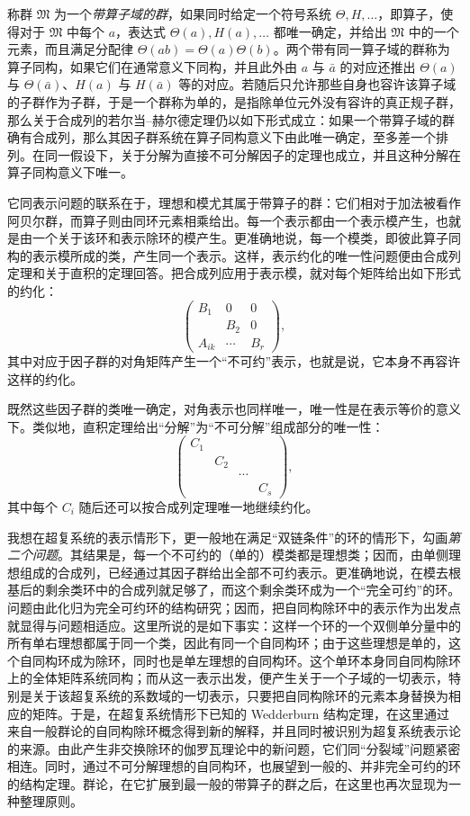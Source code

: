 称群 $\mathfrak{M}$ 为一个\emph{带算子域的群}，如果同时给定一个符号系统 $\Theta,H,\ldots$，即算子，使得对于 $\mathfrak{M}$ 中每个 $a$，表达式 $\Theta(a),H(a),\ldots$ 都唯一确定，并给出 $\mathfrak{M}$ 中的一个元素，而且满足分配律 $\Theta(ab)=\Theta(a)\Theta(b)$。两个带有同一算子域的群称为算子同构，如果它们在通常意义下同构，并且此外由 $a$ 与 $\bar a$ 的对应还推出 $\Theta(a)$ 与 $\Theta(\bar a)$、$H(a)$ 与 $H(\bar a)$ 等的对应。若随后只允许那些自身也容许该算子域的子群作为子群，于是一个群称为单的，是指除单位元外没有容许的真正规子群，那么关于合成列的若尔当--赫尔德定理仍以如下形式成立：如果一个带算子域的群确有合成列，那么其因子群系统在算子同构意义下由此唯一确定，至多差一个排列。在同一假设下，关于分解为直接不可分解因子的定理也成立，并且这种分解在算子同构意义下唯一。

它同表示问题的联系在于，理想和模尤其属于带算子的群：它们相对于加法被看作阿贝尔群，而算子则由同环元素相乘给出。每一个表示都由一个表示模产生，也就是由一个关于该环和表示除环的模产生。更准确地说，每一个模类，即彼此算子同构的表示模所成的类，产生同一个表示。这样，表示约化的唯一性问题便由合成列定理和关于直积的定理回答。把合成列应用于表示模，就对每个矩阵给出如下形式的约化：
\[
\begin{pmatrix}
B_1&0&0\\
&B_2&0\\
A_{ik}&\cdots&B_r
\end{pmatrix},
\]
其中对应于因子群的对角矩阵产生一个“不可约”表示，也就是说，它本身不再容许这样的约化。

既然这些因子群的类唯一确定，对角表示也同样唯一，唯一性是在表示等价的意义下。类似地，直积定理给出“分解”为“不可分解”组成部分的唯一性：
\[
\begin{pmatrix}
C_1&&&\\
&C_2&&\\
&&\cdots&\\
&&&C_s
\end{pmatrix},
\]
其中每个 $C_i$ 随后还可以按合成列定理唯一地继续约化。

我想在超复系统的表示情形下，更一般地在满足“双链条件”的环的情形下，勾画\emph{第二个问题}。其结果是，每一个不可约的（单的）模类都是理想类；因而，由单侧理想组成的合成列，已经通过其因子群给出全部不可约表示。更准确地说，在模去根基后的剩余类环中的合成列就足够了，而这个剩余类环成为一个“完全可约”的环。问题由此化归为完全可约环的结构研究；因而，把自同构除环中的表示作为出发点就显得与问题相适应。这里所说的是如下事实：这样一个环的一个双侧单分量中的所有单右理想都属于同一个类，因此有同一个自同构环；由于这些理想是单的，这个自同构环成为除环，同时也是单左理想的自同构环。这个单环本身同自同构除环上的全体矩阵系统同构；而从这一表示出发，便产生关于一个子域的一切表示，特别是关于该超复系统的系数域的一切表示，只要把自同构除环的元素本身替换为相应的矩阵。于是，在超复系统情形下已知的 Wedderburn 结构定理，在这里通过来自一般群论的自同构除环概念得到新的解释，并且同时被识别为超复系统表示论的来源。由此产生非交换除环的伽罗瓦理论中的新问题，它们同“分裂域”问题紧密相连。同时，通过不可分解理想的自同构环，也展望到一般的、并非完全可约的环的结构定理。群论，在它扩展到最一般的带算子的群之后，在这里也再次显现为一种整理原则。

\endgroup

